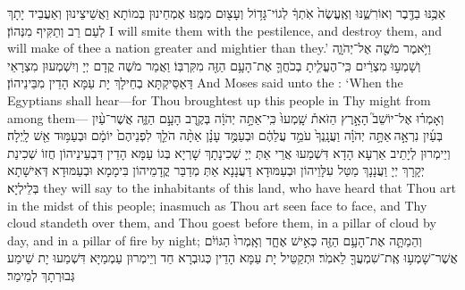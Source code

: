{אַכֶּ֥נּוּ בַדֶּ֖בֶר וְאוֹרִשֶׁ֑נּוּ וְאֶֽעֱשֶׂה֙ אֹֽתְךָ֔ לְגוֹי־גָּד֥וֹל וְעָצ֖וּם מִמֶּֽנּוּ׃
}
{אֶמְחֵינוּן בְּמוֹתָא וַאֲשֵׁיצֵינוּן וְאַעֲבֵיד יָתָךְ לְעַם רַב וְתַקִּיף מִנְּהוֹן׃}
{I will smite them with the pestilence, and destroy them, and will make of thee a nation greater and mightier than they.’}{}
{וַיֹּ֥אמֶר מֹשֶׁ֖ה אֶל־יְהֹוָ֑ה וְשָׁמְע֣וּ מִצְרַ֔יִם כִּֽי־הֶעֱלִ֧יתָ בְכֹחֲךָ֛ אֶת־הָעָ֥ם הַזֶּ֖ה מִקִּרְבּֽוֹ׃
}
{וַאֲמַר מֹשֶׁה קֳדָם יְיָ וְיִשְׁמְעוּן מִצְרָאֵי דַּאַסֵּיקְתָּא בְחֵילָךְ יָת עַמָּא הָדֵין מִבֵּינֵיהוֹן׃}
{And Moses said unto the \lord: ‘When the Egyptians shall hear—for Thou broughtest up this people in Thy might from among them—}{}
{וְאָמְר֗וּ אֶל־יוֹשֵׁב֮ הָאָ֣רֶץ הַזֹּאת֒ שָֽׁמְעוּ֙ כִּֽי־אַתָּ֣ה יְהֹוָ֔ה בְּקֶ֖רֶב הָעָ֣ם הַזֶּ֑ה אֲשֶׁר־עַ֨יִן בְּעַ֜יִן נִרְאָ֣ה \legarmeh  אַתָּ֣ה יְהֹוָ֗ה וַעֲנָֽנְךָ֙ עֹמֵ֣ד עֲלֵהֶ֔ם וּבְעַמֻּ֣ד עָנָ֗ן אַתָּ֨ה הֹלֵ֤ךְ לִפְנֵיהֶם֙ יוֹמָ֔ם וּבְעַמּ֥וּד אֵ֖שׁ לָֽיְלָה׃
}
{וְיֵימְרוּן לְיָתֵיב אַרְעָא הָדָא דִּשְׁמַעוּ אֲרֵי אַתְּ יְיָ שְׁכִינָתָךְ שָׁרְיָא בְּגוֹ עַמָּא הָדֵין דִּבְעֵינֵיהוֹן חֲזוֹ שְׁכִינַת יְקָרָךְ יְיָ וַעֲנָנָךְ מַטַּל עִלָּוֵיהוֹן וּבְעַמּוּדָא דַּעֲנָנָא אַתְּ מְדַבַּר קֳדָמֵיהוֹן בִּימָמָא וּבְעַמּוּדָא דְּאִישָׁתָא בְּלֵילְיָא׃}
{they will say to the inhabitants of this land, who have heard that Thou \lord\space art in the midst of this people; inasmuch as Thou \lord\space art seen face to face, and Thy cloud standeth over them, and Thou goest before them, in a pillar of cloud by day, and in a pillar of fire by night;}{}
{וְהֵמַתָּ֛ה אֶת־הָעָ֥ם הַזֶּ֖ה כְּאִ֣ישׁ אֶחָ֑ד וְאָֽמְרוּ֙ הַגּוֹיִ֔ם אֲשֶׁר־שָׁמְע֥וּ אֶֽת־שִׁמְעֲךָ֖ לֵאמֹֽר׃
}
{וּתְקַטֵּיל יָת עַמָּא הָדֵין כְּגוּבְרָא חַד וְיֵימְרוּן עַמְמַיָּא דִּשְׁמַעוּ יָת שֵׁימַע גְּבוּרְתָךְ לְמֵימַר׃}
